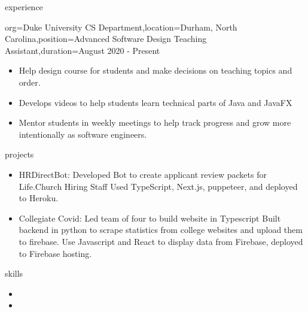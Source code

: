 \documentclass{resume}
\begin{document}
\begin{ResumeSection}{experience}
    \begin{ResumeSubsection}{org={Duke University CS Department},location={Durham, North Carolina},position={Advanced Software Design Teaching Assistant},duration={August 2020 - Present}}
        \begin{itemize}
            \item Help design course for students and make decisions on teaching topics and order.
            \item Develops videos to help students learn technical parts of Java and JavaFX
            \item Mentor students in weekly meetings to help track progress and grow more intentionally as software engineers.
        \end{itemize}

    \end{ResumeSubsection}
\end{ResumeSection}


\begin{ResumeSection}{projects}
    \begin{itemize}
        \item {HRDirectBot: Developed Bot to create applicant review packets for Life.Church Hiring Staff}
            Used TypeScript, Next.js, puppeteer, and deployed to Heroku.
        \item {Collegiate Covid: Led team of four to build website in Typescript}
            Built backend in python to scrape statistics from college websites and upload them to firebase.
            Use Javascript and React to display data from Firebase, deployed to Firebase hosting.
    \end{itemize}
\end{ResumeSection}

\begin{ResumeSection}{skills}
    \begin{ResumeSubsection}{}
        \begin{itemize}
            \item {}
            \item {}
        \end{itemize}
    \end{ResumeSubsection}
\end{ResumeSection}
\end{document}
